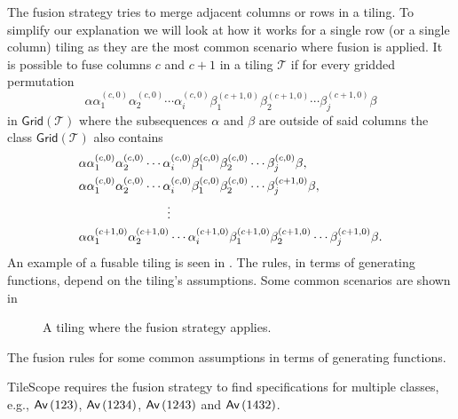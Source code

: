 The fusion strategy tries to merge adjacent columns or rows in a tiling. To simplify our explanation we will look at how it works for a single row (or a single column) tiling as they are the most common scenario where fusion is applied. It is possible to fuse columns $c$ and $c+1$ in a tiling $\mathcal{T}$ if for every gridded permutation
\[
\alpha \alpha_1^{(c,0)}\alpha_2^{(c,0)}\dotsm\alpha_i^{(c,0)}\beta_1^{(c+1,0)}\beta_2^{(c+1,0)}\dotsm\beta_j^{(c+1,0)} \beta 
\]
in $\textsf{Grid}(\mathcal{T})$ where the subsequences $\alpha$ and $\beta$ are outside of said columns the class $\textsf{Grid}(\mathcal{T})$ also contains
\begin{align*}
    &\alpha\alpha_1^{(c,0)}\alpha_2^{(c,0)}\dotsm\alpha_i^{(c,0)}\beta_1^{(c,0)}\beta_2^{(c,0)}\dotsm\beta_j^{(c,0)}\beta,\\
    &\alpha\alpha_1^{(c,0)}\alpha_2^{(c,0)}\dotsm\alpha_i^{(c,0)}\beta_1^{(c,0)}\beta_2^{(c,0)}\dotsm\beta_j^{(c+1,0)}\beta,\\
    &\hspace{2.5cm}\vdots\\
    &\alpha\alpha_1^{(c+1,0)}\alpha_2^{(c+1,0)}\dotsm\alpha_i^{(c+1,0)}\beta_1^{(c+1,0)}\beta_2^{(c+1,0)}\dotsm\beta_j^{(c+1,0)}\beta.
\end{align*}
An example of a fusable tiling is seen in . The rules, in terms of generating functions, depend on the tiling's assumptions. Some common scenarios are shown in 

\begin{figure}[ht!]
    \centering
    
    \caption{A tiling where the fusion strategy applies.}
    \label{fig:fusable}
\end{figure}

\begin{table}[ht!]
    \centering
    
    \caption{The fusion rules for some common assumptions in terms of generating functions.}
    \label{tab:fusegf}
\end{table}

TileScope requires the fusion strategy to find specifications for multiple classes, e.g., $\textsf{Av}\left(123\right)$, $\textsf{Av}\left(1234\right)$, $\textsf{Av}\left(1243\right)$ and $\textsf{Av}\left(1432\right)$.
